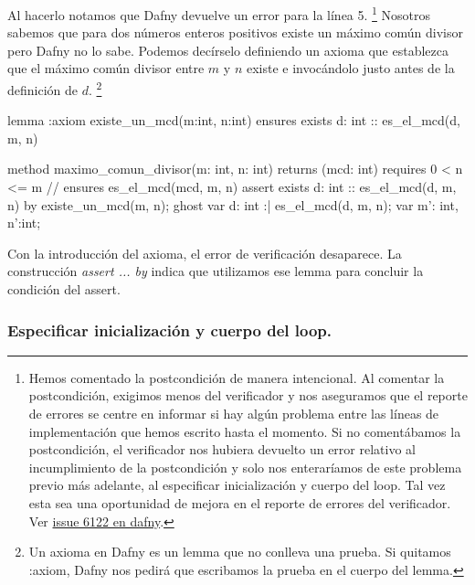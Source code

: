 \documentclass[12pt, a4paper, openany, fleqn]{book}
\begin{document}
    Al hacerlo notamos que Dafny devuelve un error para la línea 5. \footnote{Hemos comentado la postcondición de manera intencional. Al comentar la postcondición, exigimos menos del verificador y nos aseguramos que el reporte de errores se centre en informar si hay algún problema entre las líneas de implementación que hemos escrito hasta el momento. Si no comentábamos la postcondición, el verificador nos hubiera devuelto un error relativo al incumplimiento de la postcondición y solo nos enteraríamos de este problema previo más adelante, al especificar inicialización y cuerpo del loop. Tal vez esta sea una oportunidad de mejora en el reporte de errores del verificador. Ver \href{https://github.com/dafny-lang/dafny/issues/6122}{issue 6122 en dafny}.}
    Nosotros sabemos que para dos números enteros positivos existe un máximo común divisor pero Dafny no lo sabe. Podemos decírselo definiendo un axioma que establezca que el máximo común divisor entre $m$ y $n$ existe e invocándolo justo antes de la definición de $d$. \footnote{Un axioma en Dafny es un lemma que no conlleva una prueba. Si quitamos :axiom, Dafny nos pedirá que escribamos la prueba en el cuerpo del lemma.}

    \vspace{1em}
    \begin{greenbox}
    \begin{dafny}[gobble=8]
        lemma {:axiom} existe_un_mcd(m:int, n:int)
            ensures exists d: int :: es_el_mcd(d, m, n)

        method maximo_comun_divisor(m: int, n: int) returns (mcd: int)
            requires 0 < n <= m
            // ensures es_el_mcd(mcd, m, n)
        {
            assert exists d: int :: es_el_mcd(d, m, n) by {
                existe_un_mcd(m, n);
            }
            ghost var d: int :| es_el_mcd(d, m, n);
            var m': int, n':int;
        }
    \end{dafny}
    \end{greenbox}
    \vspace{1em}

    Con la introducción del axioma, el error de verificación desaparece. La construcción \textit{assert ... by} indica que utilizamos ese lemma para concluir la condición del assert.

    \subsubsection{Especificar inicialización y cuerpo del loop.}
\end{document}
